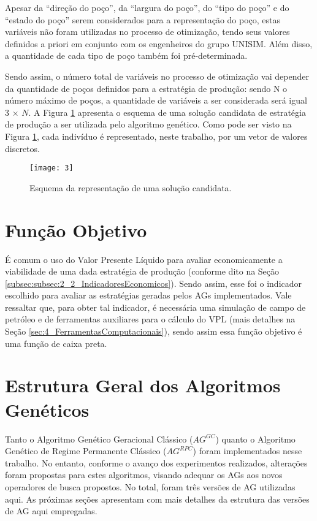 Apesar da “direção do poço”, da “largura do poço”, do “tipo do poço” e do “estado do poço” serem considerados para a representação do poço, estas variáveis não foram utilizadas no processo de otimização, tendo seus valores definidos a priori em conjunto com os engenheiros do grupo UNISIM. Além disso, a quantidade de cada tipo de poço também foi pré-determinada. 

Sendo assim, o número total de variáveis no processo de otimização vai depender da quantidade de poços definidos para a estratégia de produção: sendo N o número máximo de poços, a quantidade de variáveis a ser considerada será igual 3 $\times$ $N$. A Figura \ref{fig:fig3_1} apresenta o esquema de uma solução candidata de estratégia de produção a ser utilizada pelo algoritmo genético. Como pode ser visto na Figura \ref{fig:fig3_1}, cada indivíduo é representado, neste trabalho, por um vetor de valores discretos.

\begin{figure}[!htbp]
  \centering
  \texttt{[image: 3]}
  \caption{Esquema da representação de uma solução candidata.}
  \label{fig:fig3_1}
\end{figure}

\section{Função Objetivo}
\label{sec:3_FuncaoObjetivo}
É comum o uso do Valor Presente Líquido para avaliar economicamente a viabilidade de uma dada estratégia de produção (conforme dito na Seção \ref{subsec:subsec:2_2_IndicadoresEconomicos}). Sendo assim, esse foi o indicador escolhido para avaliar as estratégias geradas pelos AGs implementados. Vale ressaltar que, para obter tal indicador, é necessária uma simulação de campo de petróleo e de ferramentas auxiliares para o cálculo do VPL (mais detalhes na Seção \ref{sec:4_FerramentasComputacionais}), sendo assim essa função objetivo é uma função de caixa preta. 

\section{Estrutura Geral dos Algoritmos Genéticos}
\label{sec:3_EstruturaAlgoritmoGenetico}
Tanto o Algoritmo Genético Geracional Clássico ($AG^{GC}$) quanto o Algoritmo Genético de Regime Permanente Clássico ($AG^{RPC}$) foram implementados nesse trabalho. No entanto, conforme o avanço dos experimentos realizados, alterações foram propostas para estes algoritmos, visando adequar os AGs aos novos operadores de busca propostos.  No total, foram três versões de AG utilizadas aqui.  As próximas seções apresentam com mais detalhes da estrutura das versões de AG aqui empregadas.


